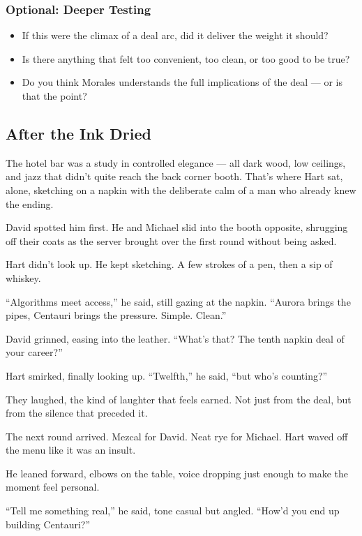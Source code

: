\subsubsection{Optional: Deeper Testing}

\begin{itemize}
  \item If this were the climax of a deal arc, did it deliver the weight it should?
  \item Is there anything that felt too convenient, too clean, or too good to be true?
  \item Do you think Morales understands the full implications of the deal — or is that the point?
\end{itemize}




\subsection{After the Ink Dried}

The hotel bar was a study in controlled elegance — all dark wood, low ceilings, and jazz that didn’t quite reach 
the back corner booth.  
That’s where Hart sat, alone, sketching on a napkin with the deliberate calm of a man who already knew the ending.

David spotted him first.  
He and Michael slid into the booth opposite, shrugging off their coats as the server brought over the first 
round without being asked.

Hart didn’t look up. He kept sketching. A few strokes of a pen, then a sip of whiskey.

“Algorithms meet access,” he said, still gazing at the napkin. “Aurora brings the pipes, Centauri brings the pressure. 
Simple. Clean.”

David grinned, easing into the leather. “What’s that? The tenth napkin deal of your career?”

Hart smirked, finally looking up. “Twelfth,” he said, “but who’s counting?”

They laughed, the kind of laughter that feels earned. Not just from the deal, but from the silence that preceded it.

The next round arrived. Mezcal for David. Neat rye for Michael. Hart waved off the menu like it was an insult.

He leaned forward, elbows on the table, voice dropping just enough to make the moment feel personal.

“Tell me something real,” he said, tone casual but angled. “How’d you end up building Centauri?”

